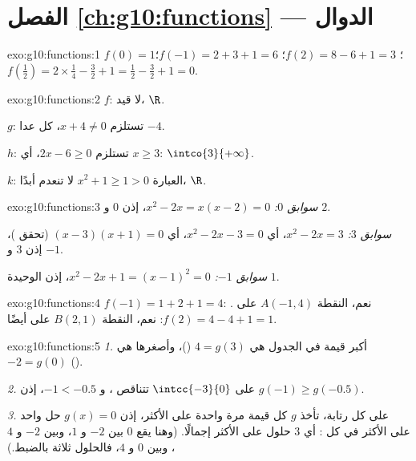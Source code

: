 \section*{الفصل \ref{ch:g10:functions} --- الدوال}

\begin{solution}{exo:g10:functions:1}
$f(0) = 1$؛ \quad $f(2) = 8 - 6 + 1 = 3$؛ \quad
$f(-1) = 2 + 3 + 1 = 6$؛ \quad
$f\!\left(\tfrac12\right) = 2 \times \tfrac14 - \tfrac32 + 1 = \tfrac12 -
\tfrac32 + 1 = 0$.
\end{solution}

\begin{solution}{exo:g10:functions:2}
$f$: لا قيد،  $\R$.

$g$: تستلزم $x + 4 \neq 0$،  كل  عدا $-4$.

$h$: تستلزم $2x - 6 \geq 0$، أي $x \geq 3$: 
$\intco{3}{+\infty}$.

$k$: العبارة $x^2 + 1 \geq 1 > 0$ لا تنعدم أبدًا،  $\R$.
\end{solution}

\begin{solution}{exo:g10:functions:3}
\emph{سوابق $0$:} $x^2 - 2x = x(x-2) = 0$، إذن $0$ و $2$.

\emph{سوابق $3$:} $x^2 - 2x = 3$، أي $x^2 - 2x - 3 = 0$، أي
$(x-3)(x+1) = 0$ (تحقق )، إذن $3$ و $-1$.

\emph{سوابق $-1$:} $x^2 - 2x + 1 = (x - 1)^2 = 0$، إذن 
الوحيدة $1$.
\end{solution}

\begin{solution}{exo:g10:functions:4}
$f(-1) = 1 + 2 + 1 = 4$: نعم، النقطة $A(-1, 4)$ على .
$f(2) = 4 - 4 + 1 = 1$: نعم، النقطة $B(2, 1)$ على  أيضًا.
\end{solution}

\begin{solution}{exo:g10:functions:5}
\emph{1.} أكبر قيمة في الجدول هي $4 = g(3)$ ()، وأصغرها
هي $-2 = g(0)$ ().

\emph{2.} على $\intcc{-3}{0}$ تتناقص ، و
$-1 < -0.5$، إذن $g(-1) \geq g(-0.5)$.

\emph{3.} على كل  رتابة، تأخذ $g$ كل قيمة مرة واحدة
على الأكثر، إذن  $g(x) = 0$ حل واحد على الأكثر في كل : أي $3$
حلول على الأكثر إجمالًا. (وهنا يقع $0$ بين $-2$ و $1$، وبين $-2$ و
$4$، وبين $0$ و $4$، فالحلول ثلاثة بالضبط.)
\end{solution}

